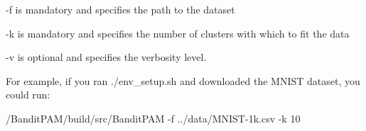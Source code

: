 \begin{DoxyItemize}
\item {\ttfamily -\/f} is mandatory and specifies the path to the dataset
\item {\ttfamily -\/k} is mandatory and specifies the number of clusters with which to fit the data
\item {\ttfamily -\/v} is optional and specifies the verbosity level.
\end{DoxyItemize}

For example, if you ran {\ttfamily ./env\+\_\+setup.sh} and downloaded the M\+N\+I\+ST dataset, you could run\+:


\begin{DoxyCode}
/BanditPAM/build/src/BanditPAM -f ../data/MNIST-1k.csv -k 10
\end{DoxyCode}
 